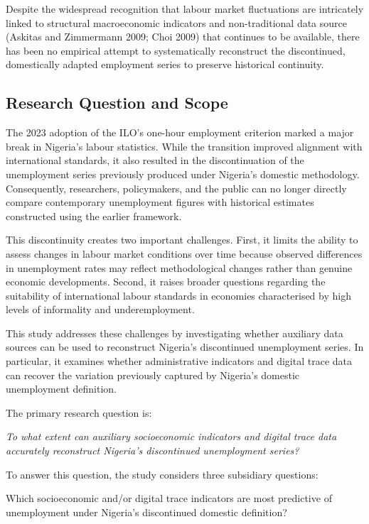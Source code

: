 \documentclass[
  letterpaper,
  DIV=11,
  numbers=noendperiod]{scrartcl}
\begin{document}
Despite the widespread recognition that labour market fluctuations are
intricately linked to structural macroeconomic indicators and
non-traditional data source (Askitas and Zimmermann 2009; Choi 2009)
that continues to be available, there has been no empirical attempt to
systematically reconstruct the discontinued, domestically adapted
employment series to preserve historical continuity.

\subsection{Research Question and
Scope}\label{research-question-and-scope}

The 2023 adoption of the ILO's one-hour employment criterion marked a
major break in Nigeria's labour statistics. While the transition
improved alignment with international standards, it also resulted in the
discontinuation of the unemployment series previously produced under
Nigeria's domestic methodology. Consequently, researchers, policymakers,
and the public can no longer directly compare contemporary unemployment
figures with historical estimates constructed using the earlier
framework.

This discontinuity creates two important challenges. First, it limits
the ability to assess changes in labour market conditions over time
because observed differences in unemployment rates may reflect
methodological changes rather than genuine economic developments.
Second, it raises broader questions regarding the suitability of
international labour standards in economies characterised by high levels
of informality and underemployment.

This study addresses these challenges by investigating whether auxiliary
data sources can be used to reconstruct Nigeria's discontinued
unemployment series. In particular, it examines whether administrative
indicators and digital trace data can recover the variation previously
captured by Nigeria's domestic unemployment definition.

The primary research question is:

\emph{To what extent can auxiliary socioeconomic indicators and digital
trace data accurately reconstruct Nigeria's discontinued unemployment
series?}

To answer this question, the study considers three subsidiary questions:

Which socioeconomic and/or digital trace indicators are most predictive
of unemployment under Nigeria's discontinued domestic definition?
\end{document}
